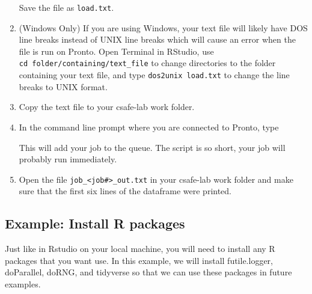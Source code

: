 \documentclass[
]{book}
\newenvironment{Shaded}{\begin{snugshade}}{\end{snugshade}}
\newcommand{\ExtensionTok}[1]{#1}
\newcommand{\NormalTok}[1]{#1}
\begin{document}
\begin{enumerate}
  Save the file as \texttt{load.txt}.
\item
  (Windows Only) If you are using Windows, your text file will likely have DOS line breaks instead of UNIX line breaks which will cause an error when the file is run on Pronto. Open Terminal in RStudio, use \texttt{cd\ folder/containing/text\_file} to change directories to the folder containing your text file, and type \texttt{dos2unix\ load.txt} to change the line breaks to UNIX format.
\item
  Copy the text file to your csafe-lab work folder.
\item
  In the command line prompt where you are connected to Pronto, type

\begin{Shaded}
\end{Shaded}

  This will add your job to the queue. The script is so short, your job will probably run immediately.
\item
  Open the file \texttt{job\_\textless{}job\#\textgreater{}\_out.txt} in your csafe-lab work folder and make sure that the first six lines of the dataframe were printed.
\end{enumerate}

\hypertarget{ex-batch-install}{%
\subsection{Example: Install R packages}\label{ex-batch-install}}

Just like in Rstudio on your local machine, you will need to install any R packages that you want use. In this example, we will install futile.logger, doParallel, doRNG, and tidyverse so that we can use these packages in future examples.
\end{document}
